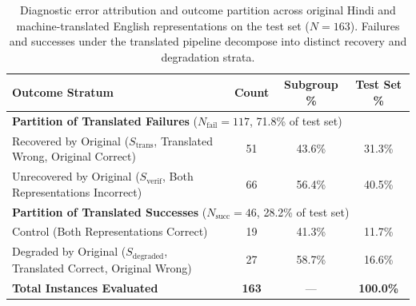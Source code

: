 \begin{table}[t]
\centering
\small
\caption{Diagnostic error attribution and outcome partition across original Hindi and machine-translated English representations on the test set ($N=163$). Failures and successes under the translated pipeline decompose into distinct recovery and degradation strata.}
\label{tab:error-attribution}
\begin{tabular}{lccc}
\toprule
\textbf{Outcome Stratum} & \textbf{Count} & \textbf{Subgroup \%} & \textbf{Test Set \%} \\
\midrule
\multicolumn{4}{l}{\textbf{Partition of Translated Failures} ($N_{\text{fail}} = 117$, 71.8\% of test set)} \\
\quad Recovered by Original ($S_{\text{trans}}$, Translated Wrong, Original Correct) & 51 & 43.6\% & 31.3\% \\
\quad Unrecovered by Original ($S_{\text{verif}}$, Both Representations Incorrect)    & 66 & 56.4\% & 40.5\% \\
\midrule
\multicolumn{4}{l}{\textbf{Partition of Translated Successes} ($N_{\text{succ}} = 46$, 28.2\% of test set)} \\
\quad Control (Both Representations Correct)                                         & 19 & 41.3\% & 11.7\% \\
\quad Degraded by Original ($S_{\text{degraded}}$, Translated Correct, Original Wrong)& 27 & 58.7\% & 16.6\% \\
\midrule
\textbf{Total Instances Evaluated} & \textbf{163} & --- & \textbf{100.0\%} \\
\bottomrule
\end{tabular}
\end{table}
